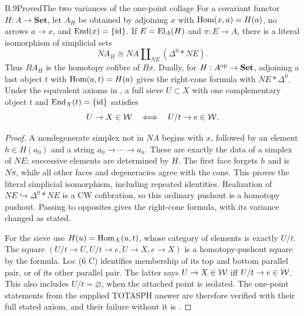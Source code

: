 \begin{claim}{B.9}{Proved}{The two variances of the one-point collage}
For a covariant functor $H:A\to\mathbf{Set}$, let $A_H$ be obtained by adjoining $x$ with $\operatorname{Hom}(x,a)=H(a)$, no arrows $a\to x$, and $\operatorname{End}(x)=\{\mathrm{id}\}$. If $E=\operatorname{El}_A(H)$ and $\pi:E\to A$, there is a literal isomorphism of simplicial sets
\[
 NA_H\cong NA\amalg_{NE}(\Delta^0*NE).
\]
Thus $BA_H$ is the homotopy cofibre of $B\pi$. Dually, for $H:A^{\mathrm{op}}\to\mathbf{Set}$, adjoining a last object $t$ with $\operatorname{Hom}(a,t)=H(a)$ gives the right-cone formula with $NE*\Delta^0$. Under the equivalent axioms in , a full sieve $U\subset X$ with one complementary object $t$ and $\operatorname{End}_X(t)=\{\mathrm{id}\}$ satisfies
\[
 U\to X\in\mathcal{W}\quad\Longleftrightarrow\quad U/t\to e\in\mathcal{W}.
\]
\end{claim}
\begin{proof}
A nondegenerate simplex not in $NA$ begins with $x$, followed by an element $h\in H(a_0)$ and a string $a_0\to\cdots\to a_n$. These are exactly the data of a simplex of $NE$; successive elements are determined by $H$. The first face forgets $h$ and is $N\pi$, while all other faces and degeneracies agree with the cone. This proves the literal simplicial isomorphism, including repeated identities. Realization of $NE\hookrightarrow\Delta^0*NE$ is a CW cofibration, so this ordinary pushout is a homotopy pushout. Passing to opposites gives the right-cone formula, with its variance changed as stated.

For the sieve use $H(u)=\operatorname{Hom}_X(u,t)$, whose category of elements is exactly $U/t$. The square $(U/t\to U,U/t\to e,U\to X,e\to X)$ is a homotopy-pushout square by the formula. Loc (6 C) identifies membership of its top and bottom parallel pair, or of its other parallel pair. The latter says $U\to X\in\mathcal{W}$ iff $U/t\to e\in\mathcal{W}$. This also includes $U/t=\varnothing$, when the attached point is isolated. The one-point statements from the supplied TOTASPH answer are therefore verified with their full stated axiom, and their failure without it is .
\end{proof}

